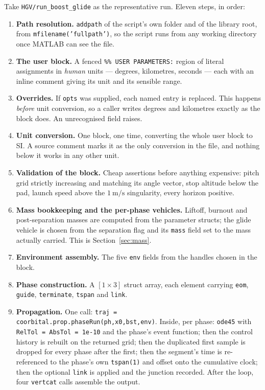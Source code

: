 \documentclass[11pt]{article}
\newcommand{\code}[1]{\texttt{#1}}
\begin{document}
Take \code{HGV/run\_boost\_glide} as the representative run. Eleven steps, in
order:

\begin{enumerate}
\item \textbf{Path resolution.} \code{addpath} of the script's own folder and
of the library root, from \code{mfilename('fullpath')}, so the script runs from
any working directory once MATLAB can see the file.

\item \textbf{The user block.} A fenced \code{\%\% USER PARAMETERS:} region of
literal assignments in \emph{human} units --- degrees, kilometres, seconds ---
each with an inline comment giving its unit and its sensible range.

\item \textbf{Overrides.} If \code{opts} was supplied, each named entry is
replaced. This happens \emph{before} unit conversion, so a caller writes
degrees and kilometres exactly as the block does. An unrecognised field raises.

\item \textbf{Unit conversion.} One block, one time, converting the whole user
block to SI. A source comment marks it as the only conversion in the file, and
nothing below it works in any other unit.

\item \textbf{Validation of the block.} Cheap assertions before anything
expensive: pitch grid strictly increasing and matching its angle vector, stop
altitude below the pad, launch speed above the $1~\mathrm{m/s}$ singularity,
every horizon positive.

\item \textbf{Mass bookkeeping and the per-phase vehicles.} Liftoff, burnout
and post-separation masses are computed from the parameter structs; the glide
vehicle is chosen from the separation flag and its \code{mass} field set to the
mass actually carried. This is Section~\ref{sec:mass}.

\item \textbf{Environment assembly.} The five \code{env} fields from the
handles chosen in the block.

\item \textbf{Phase construction.} A $[1\times3]$ struct array, each element
carrying \code{eom}, \code{guide}, \code{terminate}, \code{tspan} and
\code{link}.

\item \textbf{Propagation.} One call:
\code{traj = coorbital.prop.phaseRun(ph,x0,bst,env)}. Inside, per phase:
\code{ode45} with \code{RelTol = AbsTol = 1e-10} and the phase's event
function; then the control history is rebuilt on the returned grid; then the
duplicated first sample is dropped for every phase after the first; then the
segment's time is re-referenced to the phase's own \code{tspan(1)} and offset
onto the cumulative clock; then the optional \code{link} is applied and the
junction recorded. After the loop, four \code{vertcat} calls assemble the
output.


\end{enumerate}
\end{document}
